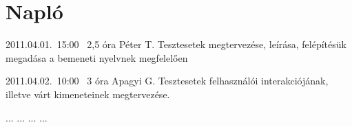 %
\section{Napló}

\begin{naplo}

\bejegyzes
{2011.04.01.~15:00~} %
{2,5 óra} %
{Péter T.\newline
}%
{Tesztesetek megtervezése, leírása, felépítésük megadása a bemeneti nyelvnek megfelelően} %

\bejegyzes
{2011.04.02.~10:00~} %
{3 óra} %
{Apagyi G.\newline
}%
{Tesztesetek felhasználói interakciójának, illetve várt kimeneteinek megtervezése.} %


\bejegyzes
{...}
{...}
{...}
{...}


\end{naplo}

